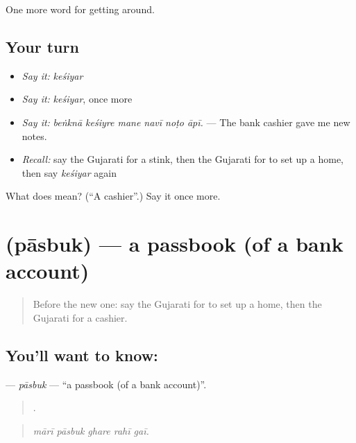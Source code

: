 \begin{grammarlens}[title={What you've built}]
One more word for getting around.
\end{grammarlens}

\subsection*{Your turn}
\begin{itemize}
\raggedright
  \item \emph{Say it:} \emph{keśiyar}
  \item \emph{Say it:} \emph{keśiyar}, once more
  \item \emph{Say it:} \emph{beṅknā keśiyre mane navī noṭo āpī.} — The bank cashier gave me new notes.
  \item \emph{Recall:} say the Gujarati for a stink, then the Gujarati for to set up a home, then say \emph{keśiyar} again
\end{itemize}

\begin{tcolorbox}[breakable,colback=teal!4,colframe=teal!35!black,title={Before you move on}]
What does  mean? (\textquotedblleft{}A cashier\textquotedblright{}.) Say it once more.
\end{tcolorbox}
\section[\texorpdfstring{\gu{પાસબુક} (pāsbuk)}{પાસબુક (pāsbuk)}]{ (pāsbuk) — a passbook (of a bank account)}

\label{lesson:GU-C424-pasbuk}



\begin{quote}
Before the new one: say the Gujarati for to set up a home, then the Gujarati for a cashier.
\end{quote}

\subsection*{You'll want to know: }
\textbf{} — \emph{pāsbuk} — \textquotedblleft{}a passbook (of a bank account)\textquotedblright{}.

\begin{quote}
    .
\end{quote}

\begin{quote}
\emph{mārī pāsbuk ghare rahī gaī.}
\end{quote}

